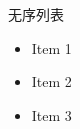 \documentclass{ctexbeamer}
\begin{document}
\begin{frame}{无序列表}

\begin{itemize}
  \item Item 1
  \item Item 2
  \item Item 3
\end{itemize}

\end{frame}
\end{document}
